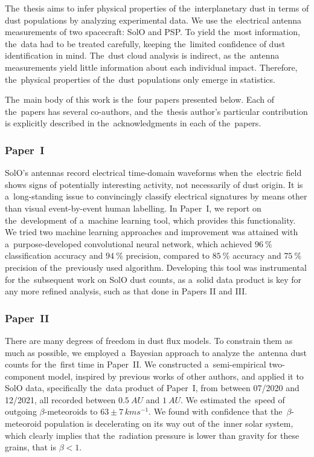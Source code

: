 The~thesis aims to infer physical properties of the~interplanetary dust in terms of dust populations by analyzing experimental data. We use the~electrical antenna measurements of two spacecraft: SolO and PSP. To yield the~most information, the~data had to be treated carefully, keeping the~limited confidence of dust identification in mind. The~dust cloud analysis is indirect, as the~antenna measurements yield little information about each individual impact. Therefore, the~physical properties of the~dust populations only emerge in statistics. 

The~main body of this work is the~four papers presented below. Each of the~papers has several co-authors, and the~thesis author's particular contribution is explicitly described in the~acknowledgments in each of the~papers.

\subsubsection{Paper~I}

SolO's antennas record electrical time-domain waveforms when the~electric field shows signs of potentially interesting activity, not necessarily of dust origin. It is a~long-standing issue to convincingly classify electrical signatures by means other than visual event-by-event human labelling. In Paper~I, we report on the~development of a~machine learning tool, which provides this functionality. We tried two machine learning approaches and improvement was attained with a~purpose-developed convolutional neural network, which achieved $\SI{96}{\%}$ classification accuracy and $\SI{94}{\%}$ precision, compared to $\SI{85}{\%}$ accuracy and $\SI{75}{\%}$ precision of the~previously used algorithm. Developing this tool was instrumental for the~subsequent work on SolO dust counts, as a~solid data product is key for any more refined analysis, such as that done in Papers II and III. 

\subsubsection{Paper~II}

There are many degrees of freedom in dust flux models. To constrain them as much as possible, we employed a~Bayesian approach to analyze the~antenna dust counts for the~first time in Paper~II. We constructed a~semi-empirical two-component model, inspired by previous works of other authors, and applied it to SolO data, specifically the~data product of Paper~I, from between 07/2020 and 12/2021, all recorded between $\SI{0.5}{AU}$ and $\SI{1}{AU}$. We estimated the~speed of outgoing $\beta$-meteoroids to $63 \pm 7 \, \si{kms^{-1}}$. We found with confidence that the~$\beta$-meteoroid population is decelerating on its way out of the~inner solar system, which clearly implies that the~radiation pressure is lower than gravity for these grains, that is $\beta < 1$. 

